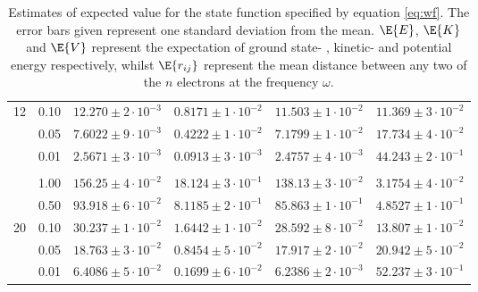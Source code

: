 \documentclass[11pt,english,a4paper]{article}
\begin{document}
\begin{table}
\begin{tabular}{c c c c c c}
12	&0.10	& $12.270\pm 2\cdot 10^{-3}$ 	& $0.8171\pm 1\cdot 10^{-2}$ 	& $11.503\pm 1\cdot 10^{-2}$		& $11.369\pm 3\cdot 10^{-2}$\\
	&0.05	& $7.6022\pm 9\cdot 10^{-3}$ 	& $0.4222\pm 1\cdot 10^{-2}$ 	& $7.1799\pm 1\cdot 10^{-2}$		& $17.734\pm 4\cdot 10^{-2}$\\
	&0.01	& $2.5671\pm 3\cdot 10^{-3}$ 	& $0.0913\pm 3\cdot 10^{-3}$ 	& $2.4757\pm 4\cdot 10^{-3}$		& $44.243\pm 2\cdot 10^{-1}$\\
	\\
	&1.00 	& $156.25\pm 4\cdot 10^{-2}$ 	& $18.124\pm 3\cdot 10^{-1}$ 	& $138.13\pm 3\cdot 10^{-2}$		& $3.1754\pm 4\cdot 10^{-2}$\\
	&0.50 	& $93.918\pm 6\cdot 10^{-2}$ 	& $8.1185\pm 2\cdot 10^{-1}$ 	& $85.863\pm 1\cdot 10^{-1}$		& $4.8527\pm 1\cdot 10^{-1}$\\
20	&0.10 	&$30.237\pm 1 \cdot 10^{-2}$ 	&$1.6442\pm 1 \cdot 10^{-2}$	& $28.592\pm 8\cdot 10^{-2}$		& $13.807\pm 1 \cdot 10^{-2}$\\
	&0.05	&$18.763\pm 3 \cdot 10^{-2}$	&$0.8454\pm 5 \cdot 10^{-2}$	& $17.917\pm 2\cdot 10^{-2}$		& $20.942\pm 5 \cdot 10^{-2}$\\
	&0.01	&$6.4086\pm 5 \cdot 10^{-2}$ 	&$0.1699\pm 6 \cdot 10^{-2}$	& $6.2386\pm 2\cdot 10^{-3}$		& $52.237\pm 3 \cdot 10^{-1}$\\
\end{tabular}
\caption{Estimates of expected value for the state function specified by equation \eqref{eq:wf}. The error bars given represent one standard deviation from the mean. $\E{E}$, $\E{K}$ and $\E{V}$ represent the expectation of ground state- , kinetic- and potential energy respectively, whilst $\E{r_{ij}}$ represent the mean distance between any two of the $n$ electrons at the frequency $\omega$.}\label{tbl:observables}
\end{table}
\end{document}

